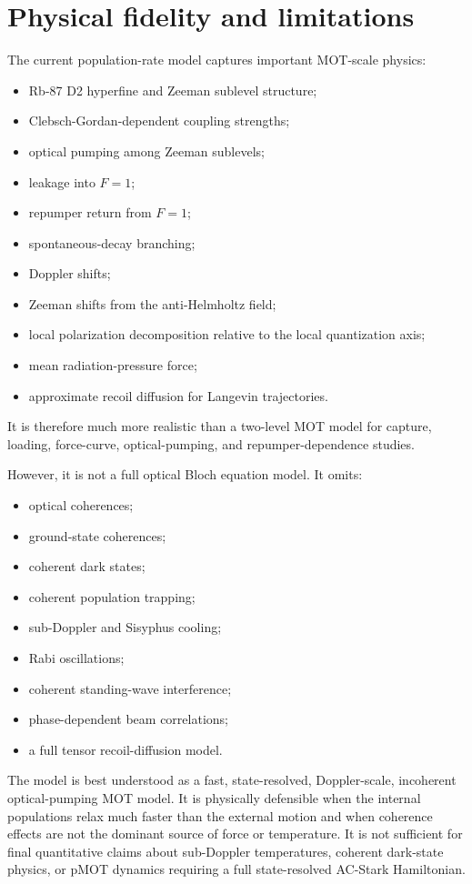 \documentclass[11pt]{article}
\begin{document}
\section{Physical fidelity and limitations}

The current population-rate model captures important MOT-scale physics:
\begin{itemize}[nosep]
    \item Rb-87 D2 hyperfine and Zeeman sublevel structure;
    \item Clebsch-Gordan-dependent coupling strengths;
    \item optical pumping among Zeeman sublevels;
    \item leakage into \(F=1\);
    \item repumper return from \(F=1\);
    \item spontaneous-decay branching;
    \item Doppler shifts;
    \item Zeeman shifts from the anti-Helmholtz field;
    \item local polarization decomposition relative to the local quantization axis;
    \item mean radiation-pressure force;
    \item approximate recoil diffusion for Langevin trajectories.
\end{itemize}

It is therefore much more realistic than a two-level MOT model for capture,
loading, force-curve, optical-pumping, and repumper-dependence studies.

However, it is not a full optical Bloch equation model.  It omits:
\begin{itemize}[nosep]
    \item optical coherences;
    \item ground-state coherences;
    \item coherent dark states;
    \item coherent population trapping;
    \item sub-Doppler and Sisyphus cooling;
    \item Rabi oscillations;
    \item coherent standing-wave interference;
    \item phase-dependent beam correlations;
    \item a full tensor recoil-diffusion model.
\end{itemize}

The model is best understood as a fast, state-resolved, Doppler-scale,
incoherent optical-pumping MOT model.  It is physically defensible when the
internal populations relax much faster than the external motion and when
coherence effects are not the dominant source of force or temperature.  It is
not sufficient for final quantitative claims about sub-Doppler temperatures,
coherent dark-state physics, or pMOT dynamics requiring a full state-resolved
AC-Stark Hamiltonian.
\end{document}
